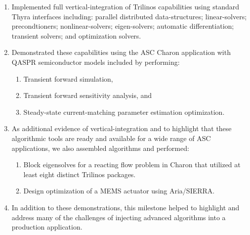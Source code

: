 \documentclass[pdf,ps2pdf,11pt]{SANDreport}
\begin{document}
\begin{enumerate}

{}\item Implemented full vertical-integration of Trilinos capabilities using
standard Thyra interfaces including: parallel distributed data-structures;
linear-solvers; precondtioners; nonlinear-solvers; eigen-solvers; automatic
differentiation; transient solvers; and optimization solvers.

{}\item Demonstrated these capabilities using the ASC Charon application with
QASPR semiconductor models included by performing:

  \begin{enumerate}
  
  {}\item Transient forward simulation,
  
  {}\item Transient forward sensitivity analysis, and
  
  {}\item Steady-state current-matching parameter estimation optimization.
  
  \end{enumerate}
  
{}\item As additional evidence of vertical-integration and to highlight that
these algorithmic tools are ready and available for a wide range of ASC
applications, we also assembled algorithms and performed:
  
  \begin{enumerate}
  
  {}\item Block eigensolves for a reacting flow problem in Charon that
  utilized at least eight distinct Trilinos packages.
  
  {}\item Design optimization of a MEMS actuator using Aria/SIERRA.
  
  \end{enumerate}
  
{}\item In addition to these demonstrations, this milestone helped to highlight
and address many of the challenges of injecting advanced algorithms into a
production application.

\end{enumerate}

\end{document}
